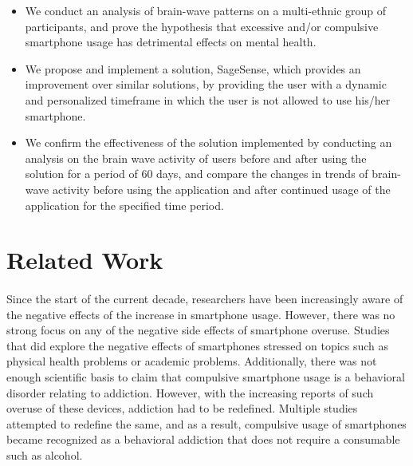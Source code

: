 \documentclass{article}
\begin{document}
\begin{itemize}
    \item We conduct an analysis of brain-wave patterns on a multi-ethnic group of participants, and prove the hypothesis that excessive and/or compulsive smartphone usage has detrimental effects on mental health.
    \item We propose and implement a solution, SageSense, which provides an improvement over similar solutions, by providing the user with a dynamic and personalized timeframe in which the user is not allowed to use his/her smartphone.
    \item We confirm the effectiveness of the solution implemented by conducting an analysis on the brain wave activity of users before and after using the solution for a period of 60 days, and compare the changes in trends of brain-wave activity before using the application and after continued usage of the application for the specified time period.
\end{itemize}

\section{Related Work}

\paragraph{} Since the start of the current decade, researchers have been increasingly aware of the negative effects of the increase in smartphone usage\cite{perlow2012sleeping, twenge2018increases, international2011iarc}. However, there was no strong focus on any of the negative side effects of smartphone overuse. Studies that did explore the negative effects of smartphones stressed on topics such as physical health problems\cite{rebold2016impact, kim2015relationship, korpinen2013self, white2004risk, inal2015effects} or academic problems\cite{alfawareh2014smartphones, samaha2016relationships, kibona2015smartphones, kibona2015review, felisoni2018cell, hawi2016excel, choi2012influence}. Additionally, there was not enough scientific basis to claim that compulsive smartphone usage is a behavioral disorder relating to addiction. However, with the increasing reports of such overuse of these devices, addiction had to be redefined. Multiple studies\cite{grant2016expanding, young2004internet, sussman2011considering} attempted to redefine the same, and as a result, compulsive usage of smartphones became recognized as a behavioral addiction that does not require a consumable such as alcohol.
\end{document}
